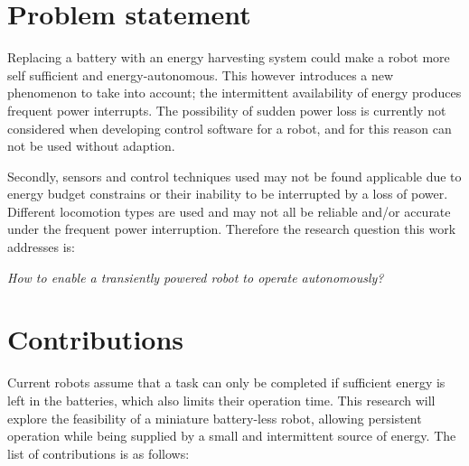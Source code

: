 \newpage

\section{Problem statement}



Replacing a battery with an energy harvesting system could make a robot more self sufficient and energy-autonomous. 
This however introduces a new phenomenon to take into account; the intermittent availability of energy produces frequent power interrupts.
The possibility of sudden power loss is currently not considered when developing control software for a robot, and for this reason can not be used without adaption.
\hfill \break

Secondly, sensors and control techniques used may not be found applicable due to energy budget constrains or their inability to be interrupted by a loss of power. %
Different locomotion types are used and may not all be reliable and/or accurate under the frequent power interruption.
Therefore the research question this work addresses is:

\begin{center}
	\textit{How to enable a transiently powered robot to operate autonomously?}
\end{center}

\section{Contributions}
Current robots assume that a task can only be completed if sufficient energy is left in the batteries, which also limits their operation time. 
This research will explore the feasibility of a miniature battery-less robot, allowing persistent operation while being supplied by a small and intermittent source of energy.
The list of contributions is as follows:

